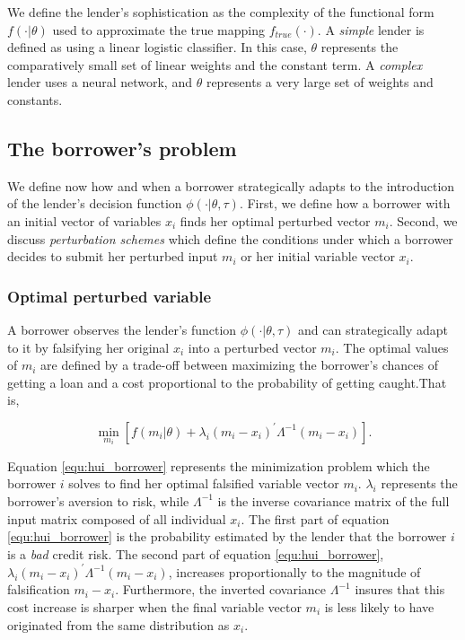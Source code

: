 \documentclass[12pt]{article} %
\begin{document}
We define the lender's sophistication as the complexity of the functional form $f(\cdot | \theta)$ used to approximate the true mapping $f_{true}(\cdot)$. A \textit{simple} lender is defined as using a linear logistic classifier. In this case, $\theta$ represents the comparatively small set of linear weights and the constant term. A \textit{complex} lender uses a neural network, and $\theta$ represents a very large set of weights and constants. 


\subsection{The borrower's problem}
\label{sec:borrowers_problem}
We define now how and when a borrower strategically adapts to the introduction of the lender's decision function $\phi(\cdot|\theta,\tau)$. First, we define how a borrower with an initial vector of variables $x_i$ finds her optimal perturbed vector $m_i$. Second, we discuss \textit{perturbation schemes} which define the conditions under which a borrower decides to submit her perturbed input $m_i$ or her initial variable vector $x_i$.

\subsubsection{Optimal perturbed variable}
A borrower observes the lender's function $\phi(\cdot|\theta,\tau)$ and can strategically adapt to it by falsifying her original $x_i$ into a perturbed vector $m_i$. The optimal values of $m_i$ are defined by a trade-off between maximizing the borrower's chances of getting a loan and a cost proportional to the probability of getting caught.That is,

\begin{equation} \label{equ:hui_borrower}
\min _{m_{i}} 
\left[
f(m_{i} | \theta)+\lambda_{i}\left(m_{i}-x_{i}\right)^{\prime} \Lambda^{-1}\left(m_{i}-x_{i}\right)
\right].
\end{equation}

Equation \eqref{equ:hui_borrower} represents the minimization problem which the borrower $i$ solves to find her optimal falsified variable vector $m_{i}$. $\lambda_i$ represents the borrower's aversion to risk, while $\Lambda^{-1}$ is the inverse covariance matrix of the full input matrix composed of all individual $x_i$. 
The first part of equation \eqref{equ:hui_borrower} is the probability estimated by the lender that the borrower $i$ is a \textit{bad} credit risk. 
The second part of equation \eqref{equ:hui_borrower}, $\lambda_{i}\left(m_{i}-x_{i}\right)^{\prime} \Lambda^{-1}\left(m_{i}-x_{i}\right)$, increases proportionally to the magnitude of falsification $m_{i}-x_{i}$. Furthermore, the inverted covariance $\Lambda^{-1}$ insures that this cost increase is sharper when the final variable vector $m_i$ is less likely to have originated from the same distribution as $x_i$. 
\end{document}
